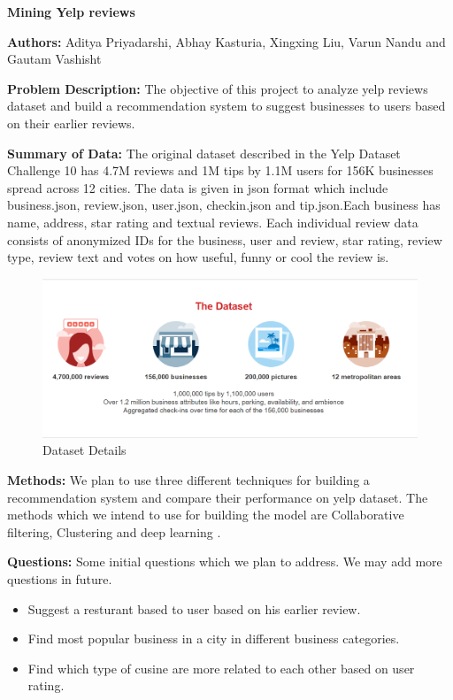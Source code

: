 \documentclass[11pt]{article}
\begin{document}
	\thispagestyle{empty}
	
	
	\centerline{\textbf{\Large{Mining Yelp reviews}}}
	
	\bigskip
	
	\noindent \textbf{Authors:} 
	Aditya Priyadarshi, Abhay Kasturia, Xingxing Liu, Varun Nandu and Gautam Vashisht
	
	\bigskip
	
	\noindent \textbf{Problem Description:} 
	The objective of this project to analyze yelp reviews dataset \cite{yelp} and build a recommendation system to suggest businesses to users based on their earlier reviews.
	
	\bigskip 
	
	\noindent \textbf{Summary of Data:} 
	The original dataset described in the Yelp Dataset Challenge 10 \cite{yelp} has 4.7M reviews and 1M tips by 1.1M users for 156K businesses spread across 12 cities. The data is given in json format which include business.json, review.json, user.json, checkin.json and tip.json.Each business has name, address, star rating and textual reviews. Each individual review data consists of anonymized IDs for the business, user and review, star rating, review type, review text and votes on how useful, funny or cool the review is. 
	\begin{figure}[h]
		\centering
		\includegraphics[scale=0.5]{data_details.png}
		\caption{Dataset Details}
	\end{figure}
	
	
	\bigskip
	
	\noindent\textbf{Methods:}
	We plan to use three different techniques for building a recommendation system and compare their performance on yelp dataset. The methods which we intend to use for building the model are Collaborative filtering\cite{cfilter}, Clustering and deep learning \cite{ydeep}.
	\bigskip
	
	\noindent\textbf{Questions:}
	Some initial questions which we plan to address. We may add more questions in future.
	\begin{itemize}
		\item Suggest a resturant based to user based on his earlier review.
		\item Find most popular business in a city in different business categories. 
		\item Find which type of cusine are more related to each other based on user rating.
	\end{itemize}
	\bigskip
	
\end{document}
